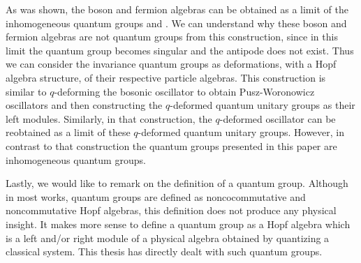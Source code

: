 As was shown, the boson and fermion algebras can be obtained
as a limit of the inhomogeneous quantum groups \BISp and \FIO. We
can understand why these boson and fermion algebras are not
quantum groups from this construction, since in this limit the
quantum group becomes singular and the antipode does not exist.
Thus we can consider the invariance quantum groups 
as deformations, with a Hopf algebra structure, of their 
respective particle algebras. This
construction is similar to $q$-deforming the bosonic oscillator to
obtain Pusz-Woronowicz \cite{puszwor} oscillators and then
constructing the $q$-deformed quantum unitary groups as their left
modules. Similarly, in that construction, the $q$-deformed
oscillator can be reobtained as a limit of these $q$-deformed
quantum unitary groups. However, in contrast to that construction the
quantum groups presented in this paper are inhomogeneous quantum
groups.

Lastly, we would like to remark on the definition of a quantum group.
Although in most works, quantum groups are defined as noncocommutative
and noncommutative Hopf algebras, this definition does not produce
any physical insight. It makes more sense to define a quantum group as
a Hopf algebra which is a left and/or right module of a physical
algebra obtained by quantizing a classical system. This thesis has directly
dealt with such quantum groups.





